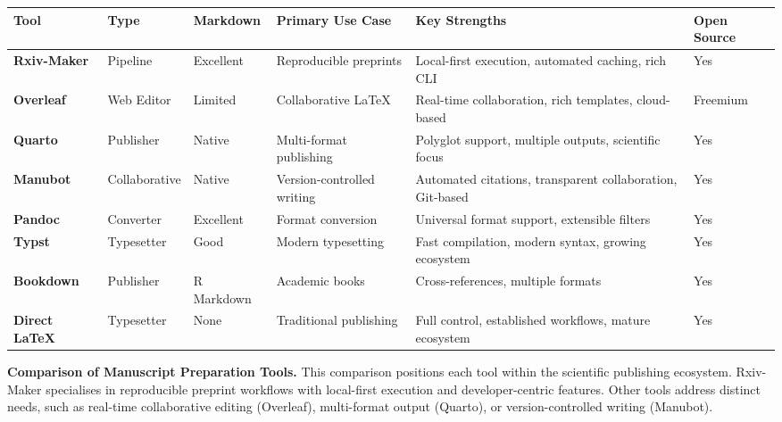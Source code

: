 \begin{stable*}[ht]
\centering
\footnotesize
\begin{tabularx}{\textwidth}{|l|l|X|X|X|X|}
\hline
\textbf{Tool} & \textbf{Type} & \textbf{Markdown} & \textbf{Primary Use Case} & \textbf{Key Strengths} & \textbf{Open Source} \\
\hline
\textbf{Rxiv-Maker} & Pipeline & Excellent & Reproducible preprints & Local-first execution, automated caching, rich CLI & Yes \\
\hline
\textbf{Overleaf} \cite{Overleaf2024} & Web Editor & Limited & Collaborative LaTeX & Real-time collaboration, rich templates, cloud-based & Freemium \\
\hline
\textbf{Quarto} \cite{Quarto2024} & Publisher & Native & Multi-format publishing & Polyglot support, multiple outputs, scientific focus & Yes \\
\hline
\textbf{Manubot} \cite{himmelstein2019} & Collaborative & Native & Version-controlled writing & Automated citations, transparent collaboration, Git-based & Yes \\
\hline
\textbf{Pandoc} \cite{pandoc2020} & Converter & Excellent & Format conversion & Universal format support, extensible filters & Yes \\
\hline
\textbf{Typst} \cite{Typst2024} & Typesetter & Good & Modern typesetting & Fast compilation, modern syntax, growing ecosystem & Yes \\
\hline
\textbf{Bookdown} \cite{Xie2016_bookdown} & Publisher & R Markdown & Academic books & Cross-references, multiple formats & Yes \\
\hline
\textbf{Direct LaTeX} & Typesetter & None & Traditional publishing & Full control, established workflows, mature ecosystem & Yes \\
\hline
\end{tabularx}
\raggedright
\caption{\textbf{Comparison of Manuscript Preparation Tools.} This comparison positions each tool within the scientific publishing ecosystem. Rxiv-Maker specialises in reproducible preprint workflows with local-first execution and developer-centric features. Other tools address distinct needs, such as real-time collaborative editing (Overleaf), multi-format output (Quarto), or version-controlled writing (Manubot).}
\label{stable:tool-comparison}
\end{stable*}
\clearpage

\renewcommand{\thesubsection}{Supp. Note \arabic{subsection}}
\setcounter{subsection}{0}


